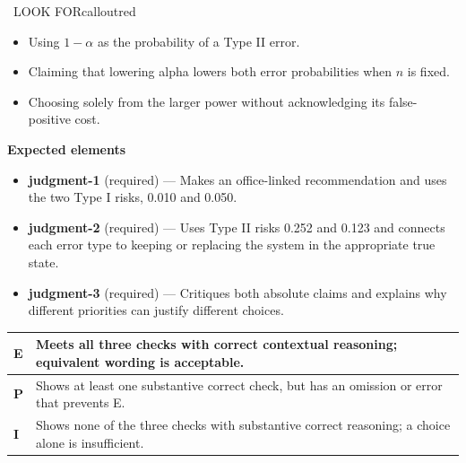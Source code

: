 \documentclass[11pt]{article}
\begin{document}
\begin{callout}{\IconWarn\ LOOK FOR}{calloutred}
\begin{itemize}[leftmargin=1.5em,itemsep=2pt,topsep=2pt]
  \item Using $1-\alpha$ as the probability of a Type II error.
  \item Claiming that lowering alpha lowers both error probabilities when $n$ is fixed.
  \item Choosing solely from the larger power without acknowledging its false-positive cost.
\end{itemize}
\end{callout}


\textbf{Expected elements}
\begin{itemize}[leftmargin=1.5em,itemsep=2pt,topsep=2pt]
  \item \textbf{judgment-1} (required) --- Makes an office-linked recommendation and uses the two Type I risks, 0.010 and 0.050.
  \item \textbf{judgment-2} (required) --- Uses Type II risks 0.252 and 0.123 and connects each error type to keeping or replacing the system in the appropriate true state.
  \item \textbf{judgment-3} (required) --- Critiques both absolute claims and explains why different priorities can justify different choices.
\end{itemize}

{\small\renewcommand{\arraystretch}{1.25}
\noindent\begin{tabular}{|p{0.5in}|p{5.9in}|}
\hline
\textbf{E} & Meets all three checks with correct contextual reasoning; equivalent wording is acceptable. \\ \hline
\textbf{P} & Shows at least one substantive correct check, but has an omission or error that prevents E. \\ \hline
\textbf{I} & Shows none of the three checks with substantive correct reasoning; a choice alone is insufficient. \\ \hline
\end{tabular}}

\clearpage
{}
\end{document}
